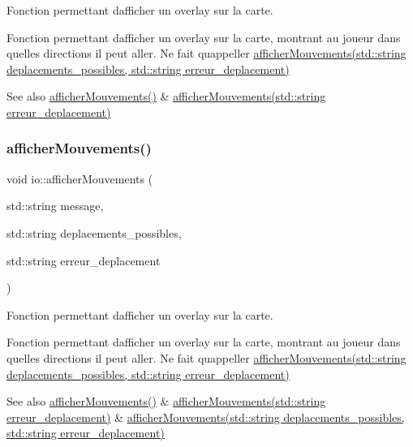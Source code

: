 Fonction permettant d\textquotesingle{}afficher un overlay sur la carte. 

Fonction permettant d\textquotesingle{}afficher un overlay sur la carte, montrant au joueur dans quelles directions il peut aller. Ne fait qu\textquotesingle{}appeller \hyperlink{namespaceio_ac0728fb89b032a7b33641e0d2c34cc28}{afficher\+Mouvements(std\+::string deplacements\+\_\+possibles, std\+::string erreur\+\_\+deplacement)}

\begin{DoxySeeAlso}{See also}
\hyperlink{namespaceio_ac60b7c3503eb53e69a2adc86368ab633}{afficher\+Mouvements()} \& \hyperlink{namespaceio_a45e9ac702aa6ea62eeca96e921b8eaa1}{afficher\+Mouvements(std\+::string erreur\+\_\+deplacement)} 
\end{DoxySeeAlso}
\mbox{\label{namespaceio_a312765b285c5f20dfe113609c86b8fdd}} 
\subsubsection{\texorpdfstring{afficher\+Mouvements()}{afficherMouvements()}\hspace{0.1cm}{\footnotesize\ttfamily [4/4]}}
{\footnotesize\ttfamily void io\+::afficher\+Mouvements (\begin{DoxyParamCaption}\item[{std\+::string}]{message,  }\item[{std\+::string}]{deplacements\+\_\+possibles,  }\item[{std\+::string}]{erreur\+\_\+deplacement }\end{DoxyParamCaption})}



Fonction permettant d\textquotesingle{}afficher un overlay sur la carte. 

Fonction permettant d\textquotesingle{}afficher un overlay sur la carte, montrant au joueur dans quelles directions il peut aller. Ne fait qu\textquotesingle{}appeller \hyperlink{namespaceio_ac0728fb89b032a7b33641e0d2c34cc28}{afficher\+Mouvements(std\+::string deplacements\+\_\+possibles, std\+::string erreur\+\_\+deplacement)}

\begin{DoxySeeAlso}{See also}
\hyperlink{namespaceio_ac60b7c3503eb53e69a2adc86368ab633}{afficher\+Mouvements()} \& \hyperlink{namespaceio_a45e9ac702aa6ea62eeca96e921b8eaa1}{afficher\+Mouvements(std\+::string erreur\+\_\+deplacement)} \& \hyperlink{namespaceio_ac0728fb89b032a7b33641e0d2c34cc28}{afficher\+Mouvements(std\+::string deplacements\+\_\+possibles, std\+::string erreur\+\_\+deplacement)} 
\end{DoxySeeAlso}
\mbox{\label{namespaceio_a7fdf85a0d766d2dcdb9870ae0458826a}} 
